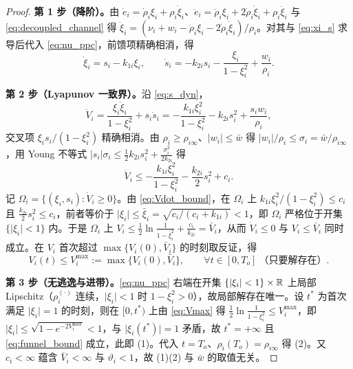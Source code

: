 \begin{proof}
\textbf{第 1 步（降阶）。}由 \(\dot e_i=\dot\rho_i\xi_i+\rho_i\dot\xi_i\)、\(\ddot e_i=\ddot\rho_i\xi_i+2\dot\rho_i\dot\xi_i+\rho_i\ddot\xi_i\) 与 \eqref{eq:decoupled_channel} 得 \(\ddot\xi_i=(\nu_i+w_i-\ddot\rho_i\xi_i-2\dot\rho_i\dot\xi_i)/\rho_i\)。对其与 \eqref{eq:xi_s} 求导后代入 \eqref{eq:nu_ppc}，前馈项精确相消，得
\begin{equation}
\dot\xi_i=s_i-k_{1i}\xi_i,\qquad
\dot s_i=-k_{2i}s_i-\frac{\xi_i}{1-\xi_i^{2}}+\frac{w_i}{\rho_i}.
\label{eq:s_dyn}
\end{equation}

\textbf{第 2 步（Lyapunov 一致界）。}沿 \eqref{eq:s_dyn}，
\begin{equation}
\dot V_i=\frac{\xi_i\dot\xi_i}{1-\xi_i^{2}}+s_i\dot s_i
=-\frac{k_{1i}\xi_i^{2}}{1-\xi_i^{2}}-k_{2i}s_i^{2}+\frac{s_iw_i}{\rho_i},
\label{eq:Vdot}
\end{equation}
交叉项 \(\xi_is_i/(1-\xi_i^2)\) 精确相消。由 \(\rho_i\ge\rho_{i\infty}\)、\(\lvert w_i\rvert\le\bar w\) 得 \(\lvert w_i\rvert/\rho_i\le\sigma_i=\bar w/\rho_{i\infty}\)，用 Young 不等式 \(\lvert s_i\rvert\sigma_i\le\frac12k_{2i}s_i^2+\frac{\sigma_i^2}{2k_{2i}}\) 得
\begin{equation}
\dot V_i\le-\frac{k_{1i}\xi_i^{2}}{1-\xi_i^{2}}-\frac{k_{2i}}{2}s_i^{2}+c_i .
\label{eq:Vdot_bound}
\end{equation}
记 \(\Omega_i=\{(\xi_i,s_i):\dot V_i\ge0\}\)。由 \eqref{eq:Vdot_bound}，在 \(\Omega_i\) 上 \(k_{1i}\xi_i^2/(1-\xi_i^2)\le c_i\) 且 \(\frac{k_{2i}}{2}s_i^2\le c_i\)，前者等价于 \(\lvert\xi_i\rvert\le\bar\xi_i=\sqrt{c_i/(c_i+k_{1i})}<1\)，即 \(\Omega_i\) 严格位于开集 \(\{\lvert\xi_i\rvert<1\}\) 内。于是 \(\Omega_i\) 上 \(V_i\le\frac12\ln\frac{1}{1-\bar\xi_i^2}+\frac{c_i}{k_{2i}}=\bar V_i\)，从而 \(\dot V_i\le0\) 与 \(V_i\le\bar V_i\) 同时成立。在 \(V_i\) 首次超过 \(\max\{V_i(0),\bar V_i\}\) 的时刻取反证，得
\begin{equation}
V_i(t)\le V_i^{\max}:=\max\{V_i(0),\bar V_i\},\qquad\forall t\in[0,T_o]\ \text{（只要解存在）}.
\label{eq:Vmax}
\end{equation}

\textbf{第 3 步（无逃逸与进带）。}\eqref{eq:nu_ppc} 右端在开集 \(\{\lvert\xi_i\rvert<1\}\times\mathbb R\) 上局部 Lipschitz（\(\rho_i^{(\cdot)}\) 连续，\(\lvert\xi_i\rvert<1\) 时 \(1-\xi_i^2>0\)），故局部解存在唯一。设 \(t^\ast\) 为首次满足 \(\lvert\xi_i\rvert=1\) 的时刻，则在 \([0,t^\ast)\) 上由 \eqref{eq:Vmax} 得 \(\frac12\ln\frac{1}{1-\xi_i^2}\le V_i^{\max}\)，即 \(\lvert\xi_i\rvert\le\sqrt{1-e^{-2V_i^{\max}}}<1\)，与 \(\lvert\xi_i(t^\ast)\rvert=1\) 矛盾，故 \(t^\ast=+\infty\) 且 \eqref{eq:funnel_bound} 成立，此即 (1)。代入 \(t=T_o\)、\(\rho_i(T_o)=\rho_{i\infty}\) 得 (2)。又 \(c_i<\infty\) 蕴含 \(\bar V_i<\infty\) 与 \(\vartheta_i<1\)，故 (1)(2) 与 \(\bar w\) 的取值无关。
\end{proof}

